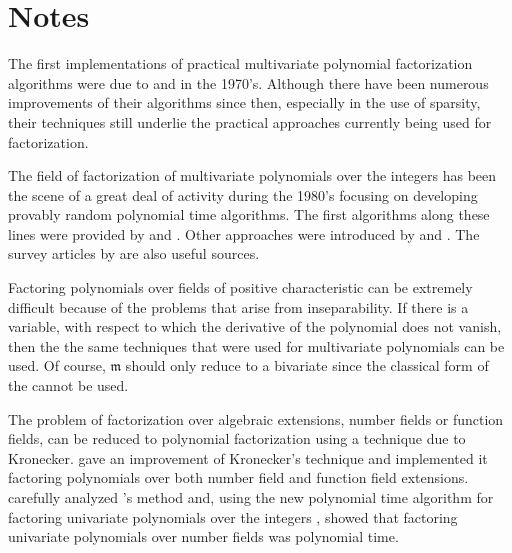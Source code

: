 \section*{Notes}

\small

The first implementations of practical multivariate polynomial
factorization algorithms were due to {\WangP} and {\Rothschild}
\cite{Wang1975-dj,Wang1976-yw,Wang1978-iu} in the 1970's.  Although there have been
numerous improvements of their algorithms since then, especially in
the use of sparsity, their techniques still underlie the practical
approaches currently being used for factorization.

The field of factorization of multivariate polynomials over the
integers has been the scene of a great deal of activity during the
1980's focusing on developing provably random polynomial time
algorithms.  The first algorithms along these lines were provided by
{\Chistov} and {\Grigoriev} \cite{Chistov1982-xt,Chistov1987-wq}.  Other
approaches were introduced by {\Gathen} and {\Kaltofen}
\cite{Von_zur_Gathen1983-dl,Von_zur_Gathen1985-iz,Kaltofen1985-vx,Kaltofen1985-fa,Kaltofen1985-ks,Kaltofen1990-jr}. 
The survey articles by {\Kaltofen}
\cite{Kaltofen1982-dj,Kaltofen1990-na,Kaltofen1992-zd} are also useful
sources. 

Factoring polynomials over fields of positive characteristic can be
extremely difficult because of the problems that arise from
inseparability.  If there is a variable, with respect to which the
derivative of the polynomial does not vanish, then the the same
techniques that were used for multivariate polynomials can be used.
Of course, $\mathfrak{m}$ should only reduce to a bivariate since the
classical form of the  cannot be
used. 

The problem of factorization over algebraic extensions, number fields
or function fields, can be reduced to polynomial factorization using a
technique due to Kronecker.  {\Trager} \cite{Trager1976-wn} gave an
improvement of Kronecker's technique and implemented it factoring
polynomials over both number field and function field extensions.
{\LandauS} \cite{Landau1985-ov} carefully analyzed {\Trager}'s method and,
using the new polynomial time algorithm for factoring univariate
polynomials over the integers \cite{Lenstra1982-gx}, showed that
factoring univariate polynomials over number fields was polynomial
time.

